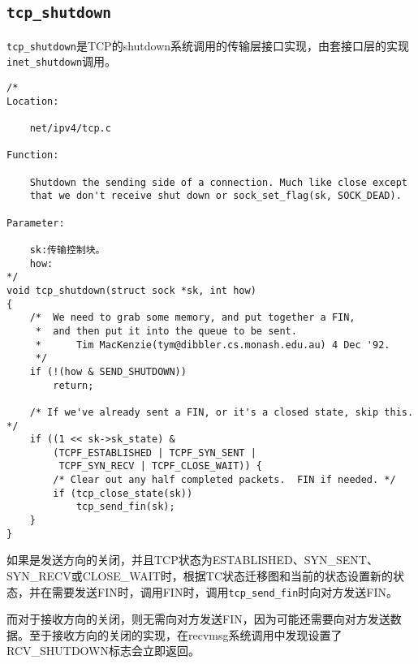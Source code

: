     \subsection{\texttt{tcp_shutdown}}

        \texttt{tcp_shutdown}是TCP的shutdown系统调用的传输层接口实现，由套接口层的实现\texttt{inet_shutdown}调用。
\begin{verbatim}
/*
Location:

    net/ipv4/tcp.c

Function:
    
    Shutdown the sending side of a connection. Much like close except
    that we don't receive shut down or sock_set_flag(sk, SOCK_DEAD).

Parameter:

    sk:传输控制块。
    how:
*/
void tcp_shutdown(struct sock *sk, int how)
{
    /*  We need to grab some memory, and put together a FIN,
     *  and then put it into the queue to be sent.
     *      Tim MacKenzie(tym@dibbler.cs.monash.edu.au) 4 Dec '92.
     */
    if (!(how & SEND_SHUTDOWN))
        return;

    /* If we've already sent a FIN, or it's a closed state, skip this. */
    if ((1 << sk->sk_state) &
        (TCPF_ESTABLISHED | TCPF_SYN_SENT |
         TCPF_SYN_RECV | TCPF_CLOSE_WAIT)) {
        /* Clear out any half completed packets.  FIN if needed. */
        if (tcp_close_state(sk))
            tcp_send_fin(sk);
    }
}
\end{verbatim}
        如果是发送方向的关闭，并且TCP状态为ESTABLISHED、SYN\_SENT、SYN\_RECV或CLOSE\_WAIT时，根据TC状态迁移图和当前的状态设置新的状态，并在需要发送FIN时，调用FIN时，调用\texttt{tcp_send_fin}时向对方发送FIN。

        而对于接收方向的关闭，则无需向对方发送FIN，因为可能还需要向对方发送数据。至于接收方向的关闭的实现，在recvmsg系统调用中发现设置了RCV\_SHUTDOWN标志会立即返回。


